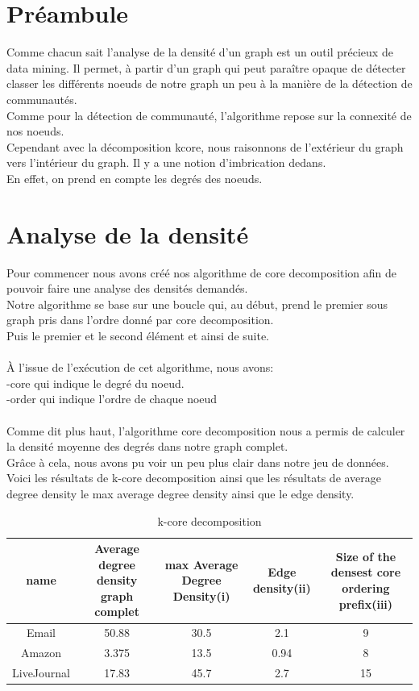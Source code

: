\documentclass[a4paper,10pt]{report}
\begin{document}
\section{Préambule}
Comme chacun sait l'analyse de la densité d'un graph est un outil précieux de data mining.
Il permet, à partir d'un graph qui peut paraître opaque de détecter classer les différents noeuds de notre graph un peu à la manière de la détection de communautés. 
\\
Comme pour la détection de communauté, l'algorithme repose sur la connexité de nos noeuds.
\\
Cependant avec la décomposition kcore, nous raisonnons de l'extérieur du graph vers l'intérieur du graph. Il y a une notion d'imbrication dedans.
\\
En effet, on prend en compte les degrés des noeuds.
\\
\section{Analyse de la densité}
Pour commencer nous avons créé nos algorithme de core decomposition afin de pouvoir faire une analyse des densités demandés.
\\
Notre algorithme se base sur une boucle qui, au début, prend le premier sous graph pris dans l'ordre donné par core decomposition.\\
Puis le premier et le second élément et ainsi de suite.
\\
\\
À l'issue de l'exécution de cet algorithme, nous avons:\\
\indent -core qui indique le degré du noeud.\\
\indent -order qui indique l'ordre de chaque noeud
        \\
        \\
Comme dit plus haut, l'algorithme core decomposition nous a permis de calculer la densité moyenne des degrés dans notre graph complet.
\\
Grâce à cela, nous avons pu voir un peu plus clair dans notre jeu de données.
\clearpage
Voici les résultats de k-core decomposition ainsi que les résultats de average degree density le max average degree density ainsi que le edge density.
\begin{table}[ht]
\caption{k-core decomposition}
\centering
\begin{tabular}{|c c c c c|}
\hline\hline
name & Average degree density graph complet & max Average Degree Density(i) & Edge density(ii) & Size of the densest core ordering prefix(iii) \\[0.5ex]
\hline

Email & 50.88 & 30.5 & 2.1 & 9 \\
Amazon & 3.375 & 13.5 & 0.94 & 8 \\
LiveJournal & 17.83 & 45.7 & 2.7 & 15  \\

\hline
\end{tabular}
\label {table:nonlin}
\end{table}
\end{document}
